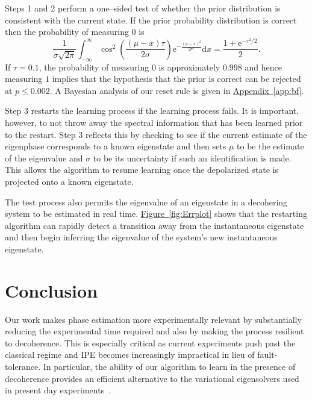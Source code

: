 \documentclass[aps,pra,amsmath,twocolumn,amssymb,superscriptaddress]{revtex4-1}
\newcommand{\app}[1]{\hyperref[app:#1]{Appendix~\ref*{app:#1}}}
\newcommand{\fig}[1]{\hyperref[fig:#1]{Figure~\ref*{fig:#1}}}
\newcommand{\ee}{\mathrm{e}}
\begin{document}
Steps 1 and 2 perform a one--sided test of whether the prior distribution is consistent with the current state.
If the prior probability distribution is correct then the probability of measuring $0$ is
\begin{equation}
    \frac{1}{\sigma\sqrt{2\pi}}\int_{-\infty}^\infty \cos^2\left(\frac{(\mu-x)\tau}{2\sigma}\right)\ee^{-\frac{(\mu-x)^2}{2\sigma^2}} \mathrm{d}x = \frac{1+\ee^{-\tau^2/2}}{2}.
\end{equation}
If $\tau=0.1$, the probability of measuring $0$ is approximately $0.998$ and hence measuring $1$ implies that the hypothesis that the prior is correct can be rejected at $p \le 0.002$. A Bayesian analysis of our reset rule
is given in \app{bf}.

Step 3 restarts the learning process if the learning process fails. It is important, however, to not throw away the spectral information that has been learned prior to the restart.  Step 3 reflects this by checking to see if the current estimate of the eigenphase corresponds to a known eigenstate and then sets $\mu$ to be the estimate of the eigenvalue and $\sigma$ to be its uncertainty if such an identification is made.  This allows the algorithm to resume learning once the depolarized state is projected onto a known eigenstate.

The test process also permits the eigenvalue of an eigenstate in a decohering system to be estimated in real time. \fig{Errplot} shows that the restarting algorithm can rapidly detect a transition away from the instantaneous eigenstate and then begin inferring the eigenvalue of the system's new instantaneous eigenstate.  

\section{Conclusion}

Our work makes phase estimation more
experimentally relevant by substantially reducing the
experimental time required and also by making the process resilient
to decoherence. This is especially critical as current experiments push past the classical
regime and IPE becomes increasingly impractical in lieu of fault-tolerance.
In particular, the ability of our algorithm to learn in the presence of decoherence provides an efficient alternative to the
variational eigensolvers used in present day experiments~\cite{PMS+14,MBL+14,WHT15}.  
\end{document}
